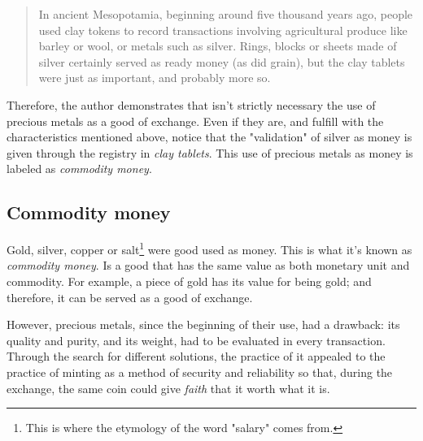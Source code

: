\documentclass[12pt,a4paper,twoside]{book}
\begin{document}
\begin{quotation}
In ancient Mesopotamia, beginning around five thousand years ago, people used clay tokens to record transactions involving agricultural produce like barley or wool, or metals such as silver. Rings, blocks or sheets made of silver certainly served as ready money (as did grain), but the clay tablets were just as important, and probably more so. \cite[p. 27]{ferguson:ascent-money}
\end{quotation}

Therefore, the author demonstrates that isn't strictly necessary the use of precious metals as a good of exchange. Even if they are, and fulfill with the characteristics mentioned above, notice that the "validation" of silver as money is given through the registry in \textit{clay tablets}. This use of precious metals as money is labeled as \textit{commodity money}.

\subsection{Commodity money}
Gold, silver, copper or salt\footnote{This is where the etymology of the word "salary" comes from.} were good used as money. This is what it's known as \textit{commodity money}. Is a good that has the same value as both monetary unit and commodity. For example, a piece of gold has its value for being gold; and therefore, it can be served as a good of exchange.

However, precious metals, since the beginning of their use, had a drawback: its quality and purity, and its weight, had to be evaluated in every transaction. Through the search for different solutions, the practice of it appealed to the practice of minting as a method of security and reliability so that, during the exchange, the same coin could give \textit{faith} that it worth what it is.
\end{document}
